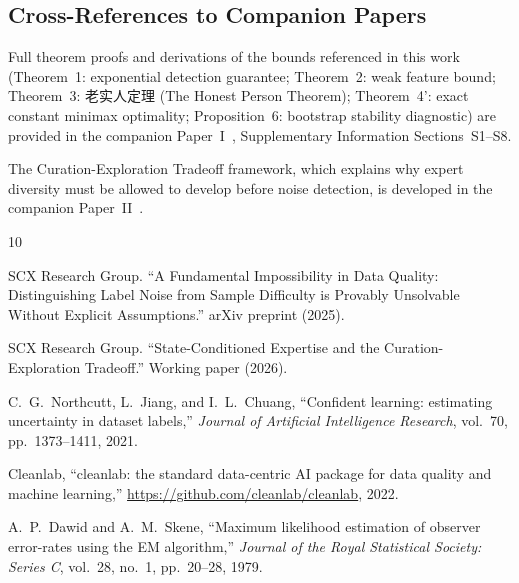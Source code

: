 \documentclass[11pt,a4paper]{article}
\begin{document}
\subsection{Cross-References to Companion Papers}

Full theorem proofs and derivations of the bounds referenced in this work (Theorem~1: exponential detection guarantee; Theorem~2: weak feature bound; Theorem~3: 老实人定理 (The Honest Person Theorem); Theorem~4': exact constant minimax optimality; Proposition~6: bootstrap stability diagnostic) are provided in the companion Paper~I~\cite{xi2025fundamental}, Supplementary Information Sections~S1--S8.

The Curation-Exploration Tradeoff framework, which explains why expert diversity must be allowed to develop before noise detection, is developed in the companion Paper~II~\cite{scx2025curation}.

\begin{thebibliography}{10}

SCX Research Group. ``A Fundamental Impossibility in Data Quality: Distinguishing Label Noise from Sample Difficulty is Provably Unsolvable Without Explicit Assumptions.'' arXiv preprint (2025).

SCX Research Group. ``State-Conditioned Expertise and the Curation-Exploration Tradeoff.'' Working paper (2026).

C.~G.~Northcutt, L.~Jiang, and I.~L.~Chuang, ``Confident learning: estimating uncertainty in dataset labels,'' \textit{Journal of Artificial Intelligence Research}, vol.~70, pp.~1373--1411, 2021.

Cleanlab, ``cleanlab: the standard data-centric AI package for data quality and machine learning,'' \url{https://github.com/cleanlab/cleanlab}, 2022.

A.~P.~Dawid and A.~M.~Skene, ``Maximum likelihood estimation of observer error-rates using the EM algorithm,'' \textit{Journal of the Royal Statistical Society: Series C}, vol.~28, no.~1, pp.~20--28, 1979.

\end{thebibliography}
\end{document}
